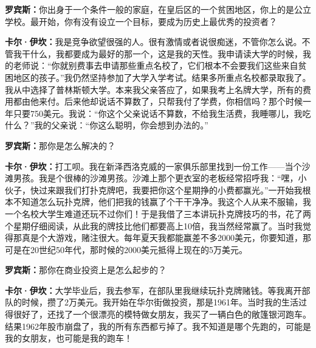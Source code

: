 \begin{BookQuote}
\textbf{罗宾斯：}你出身于一个条件一般的家庭，在皇后区的一个贫困地区，你上的是公立学校。最开始，你有没有设立一个目标，要成为历史上最优秀的投资者？
\end{BookQuote}

\begin{BookQuote}
\textbf{卡尔·伊坎：}我是竞争欲望很强的人。很有激情或者说很痴迷，不管你怎么说。不管我干什么，我都要成为最好的那一个，这是我的天性。我申请读大学的时候，我的老师说：“你就别费事去申请那些重点名校了，它们根本不会要我们这些来自贫困地区的孩子。”我仍然坚持参加了大学入学考试。结果多所重点名校都录取我了。我从中选择了普林斯顿大学。本来我父亲答应了，如果我考上名牌大学，所有的费用都由他来付。后来他却说话不算数了，只帮我付了学费，你相信吗？那个时候一年只要750美元。我说：“你这个父亲说话不算数，不给我生活费，我睡哪儿，我吃什么？”我的父亲说：“你这么聪明，你会想到办法的。”
\end{BookQuote}

\begin{BookQuote}
\textbf{罗宾斯：}那你是怎么解决的？
\end{BookQuote}

\begin{BookQuote}
\textbf{卡尔·伊坎：}打工呗。我在新泽西洛克威的一家俱乐部里找到一份工作——当个沙滩男孩。我是个很棒的沙滩男孩。沙滩上那个更衣室的老板经常招呼我：“嘿，小伙子，快过来跟我们打扑克牌吧，我要把你这个星期挣的小费都赢光。”一开始我根本不知道怎么玩扑克牌，他们把我的钱赢了个干干净净。我这个人从来不服输，我一个名校大学生难道还玩不过你们！于是我借了三本讲玩扑克牌技巧的书，花了两个星期仔细阅读，从此我的牌技比他们都要高上10倍，我当然经常赢了。当时我觉得那真是个大游戏，赌注很大。每年夏天我都能赢差不多2000美元，你要知道，那可是在20世纪50年代，那时候的2000美元抵得上现在的5万美元。
\end{BookQuote}

\begin{BookQuote}
\textbf{罗宾斯：}那你在商业投资上是怎么起步的？
\end{BookQuote}

\begin{BookQuote}
\textbf{卡尔·伊坎：}大学毕业后，我去参军，在部队里我继续玩扑克牌赌钱。等我离开部队的时候，攒了2万美元。我开始在华尔街做投资，那是1961年。当时我的生活过得很好了，还找了一个很漂亮的模特做女朋友，我买了一辆白色的敞篷银河跑车。结果1962年股市崩盘了，我的所有东西都亏掉了。我不知道是哪个先跑的，可能是我的女朋友，也可能是我的跑车！
\end{BookQuote}

